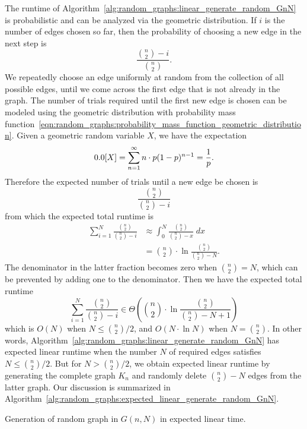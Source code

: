 The runtime of
Algorithm~\ref{alg:random_graphs:linear_generate_random_GnN} is
probabilistic and can be analyzed via the geometric distribution. If
$i$ is the number of edges chosen so far, then the probability of
choosing a new edge in the next step is
\[
\frac{\binom{n}{2} - i} {\binom{n}{2}}.
\]
We repeatedly choose an edge uniformly at random from the collection
of all possible edges, until we come across the first edge that is not
already in the graph. The number of trials required until the first
new edge is chosen can be modeled using the geometric distribution
with probability mass
function~\eqref{eqn:random_graphs:probability_mass_function_geometric_distribution}.
Given a geometric random variable $X$, we have the expectation
\[
\E[X]
=
\sum_{n=1}^\infty n \cdot p(1 - p)^{n-1}
=
\frac{1}{p}.
\]
Therefore the expected number of trials until a new edge be chosen is
\[
\frac{\binom{n}{2}} {\binom{n}{2} - i}
\]
from which the expected total runtime is
\begin{align*}
\label{eqn:random_graphs:Erdos_Renyi_expected_total_runtime_sum}
\sum_{i=1}^N \frac{\binom{n}{2}} {\binom{n}{2} - i}
&\approx
\int_0^N \frac{\binom{n}{2}} {\binom{n}{2} - x} \; dx \\[4pt]
&=
\binom{n}{2} \cdot \ln \frac{\binom{n}{2}} {\binom{n}{2} - N}.
\end{align*}
The denominator in the latter fraction becomes zero when
$\binom{n}{2} = N$, which can be prevented by adding one to the
denominator. Then we have the expected total runtime
\[
\sum_{i=1}^N \frac{\binom{n}{2}} {\binom{n}{2} - i}
\in
\Theta
\left(
  \binom{n}{2} \cdot \ln \frac{\binom{n}{2}} {\binom{n}{2} - N + 1}
\right)
\]
which is $O(N)$ when $N \leq \binom{n}{2} / 2$, and $O(N \cdot \ln N)$
when $N = \binom{n}{2}$. In other words,
Algorithm~\ref{alg:random_graphs:linear_generate_random_GnN} has
expected linear runtime when the number $N$ of required edges
satisfies $N \leq \binom{n}{2} / 2$. But for $N > \binom{n}{2} / 2$,
we obtain expected linear runtime by generating the
complete graph $K_n$ and randomly delete
$\binom{n}{2} - N$ edges from the latter graph. Our discussion is
summarized in
Algorithm~\ref{alg:random_graphs:expected_linear_generate_random_GnN}.

\begin{algorithm}[!htbp]

\caption{Generation of random graph in $G(n,N)$ in expected linear time.}
\label{alg:random_graphs:expected_linear_generate_random_GnN}
\end{algorithm}

